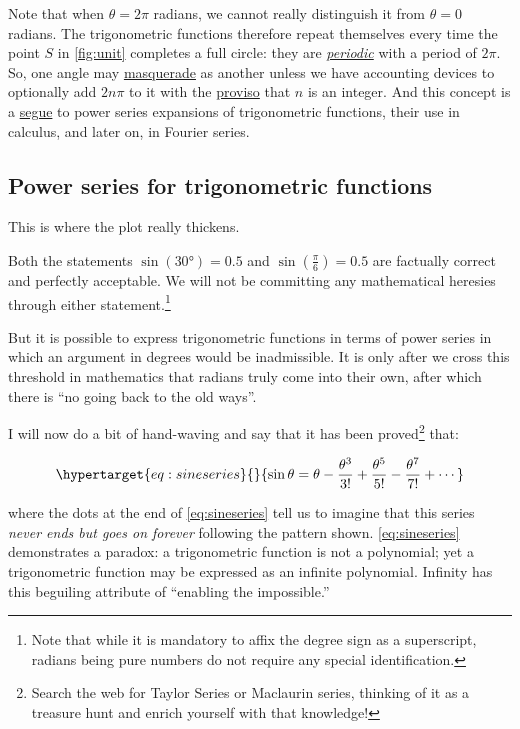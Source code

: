 \documentclass[
  a4paper,
]{article}
\begin{document}
Note that when \(\theta = 2\pi\) radians, we cannot really distinguish
it from \(\theta=0\) radians. The trigonometric functions therefore
repeat themselves every time the point \(S\) in \cref{fig:unit}
completes a full circle: they are
\href{https://mathworld.wolfram.com/PeriodicFunction.html}{\emph{periodic}}
with a period of \(2\pi\). So, one angle may
\href{https://www.thefreedictionary.com/masquerade}{masquerade} as
another unless we have accounting devices to optionally add \(2n\pi\) to
it with the
\href{https://dictionary.cambridge.org/dictionary/english/proviso}{proviso}
that \(n\) is an integer. And this concept is a
\href{https://www.dictionary.com/browse/segue}{segue} to power series
expansions of trigonometric functions, their use in calculus, and later
on, in Fourier series.

\hypertarget{power-series-for-trigonometric-functions}{%
\subsection{Power series for trigonometric
functions}\label{power-series-for-trigonometric-functions}}

This is where the plot really thickens.

Both the statements \(\sin(30°)=0.5\) and \(\sin(\frac{\pi}{6})=0.5\)
are factually correct and perfectly acceptable. We will not be
committing any mathematical heresies through either
statement.\footnote{Note that while it is mandatory to affix the degree
  sign as a superscript, radians being pure numbers do not require any
  special identification.}

But it is possible to express trigonometric functions in terms of power
series in which an argument in degrees would be inadmissible. It is only
after we cross this threshold in mathematics that radians truly come
into their own, after which there is ``no going back to the old ways''.

I will now do a bit of hand-waving and say that it has been
proved\footnote{Search the web for Taylor Series or Maclaurin series,
  thinking of it as a treasure hunt and enrich yourself with that
  knowledge!} that:

\begin{equation}\protect\hypertarget{eq:sineseries}{}{
\sin\theta = \theta - \frac{\theta^3}{3!} + \frac{\theta^5}{5!} - \frac{\theta^7}{7!} + \cdots
}\label{eq:sineseries}\end{equation}

where the dots at the end of \cref{eq:sineseries} tell us to imagine
that this series \emph{never ends but goes on forever} following the
pattern shown. \cref{eq:sineseries} demonstrates a paradox: a
trigonometric function is not a polynomial; yet a trigonometric function
may be expressed as an infinite polynomial. Infinity has this beguiling
attribute of ``enabling the impossible.''
\end{document}
